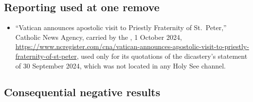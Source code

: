 \subsection*{Reporting used at one remove}

\begin{itemize}
\item ``Vatican announces apostolic visit to Priestly Fraternity of
St.\ Peter,'' Catholic News Agency, carried by the , 1 October 2024,
\url{https://www.ncregister.com/cna/vatican-announces-apostolic-visit-to-priestly-fraternity-of-st-peter},
used only for its quotations of the dicastery's statement of 30 September
2024, which was not located in any Holy See channel.
\end{itemize}

\subsection*{Consequential negative results}

